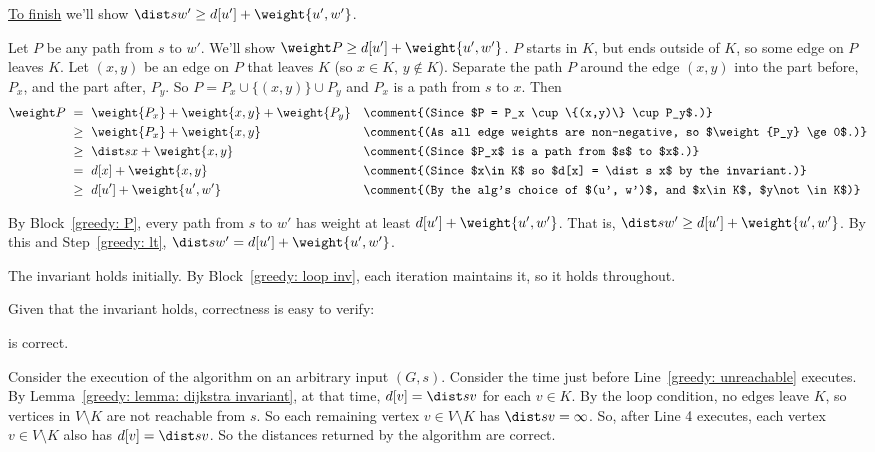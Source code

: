 \begin{longFormProof}
\begin{block}
    \smallskip
    \step \underline{To finish} we'll show $\dist s {w'} \ge d[u'] + \weight {u', w'}$.
    \begin{block}[greedy: P]
      \step Let $P$ be any path from $s$ to $w'$.  We'll show $\weight P \ge d[u'] + \weight {u', w'}$.
      \step $P$ starts in $K$, but ends outside of $K$, so some edge on $P$ leaves $K$.
      \step Let $(x,y)$ be an edge on $P$ that leaves $K$ (so $x\in K$, $y\not\in K$).
      \step Separate the path $P$ around the edge $(x,y)$ into
      the part before, $P_x$, and the part after, $P_y$.
      \step So $P = P_x \cup \{(x,y)\} \cup P_y$ and $P_x$ is a path from $s$ to $x$. Then
      \begin{align*}
        \weight P~
        &=~ \weight {P_x} + \weight {x,y} + \weight {P_y}
        && \comment{(Since $P = P_x \cup \{(x,y)\} \cup P_y$.)}
        \\
        &\ge~ \weight {P_x} + \weight {x,y}
        && \comment{(As all edge weights are non-negative, so $\weight {P_y} \ge 0$.)}
        \\
        &\ge~ \dist s x + \weight {x,y}
        && \comment{(Since $P_x$ is a path from $s$ to $x$.)}
        \\
        &=~ d[x] + \weight {x,y}
        && \comment{(Since $x\in K$ so $d[x] = \dist s x$ by the invariant.)}
        \\
        &\ge~ d[u'] + \weight {u',w'}
        && \comment{(By the alg's choice of $(u', w')$, and $x\in K$, $y\not\in K$)}
      \end{align*}
    \end{block}
    \step By Block~\ref{greedy: P}, every path from $s$ to $w'$
    has weight at least $d[u'] + \weight {u',w'}$.
    \step That is, $\dist s {w'} \ge d[u'] + \weight {u',w'}$.
    \smallskip
    \step By this and Step~\ref{greedy: lt}, $\dist s {w'} = d[u'] + \weight {u',w'}$.
  \end{block}
  \step The invariant holds initially. By Block~\ref{greedy: loop inv}, each iteration maintains it, so it holds throughout.
  \vspace*{-0.5ex}
\end{longFormProof}

Given that the invariant holds, correctness is easy to verify:

\begin{theorem}
  \Dijkstra is correct.
\end{theorem}
\begin{longFormProof}
  \step Consider the execution of the algorithm on an arbitrary input $(G, s)$.
  \step Consider the time just before Line~\ref{greedy: unreachable} executes.
  \step By Lemma~\ref{greedy: lemma: dijkstra invariant}, at that time, $d[v] = \dist s v$ for each $v\in K$.
  \step By the loop condition, no edges leave $K$, so vertices in $V\setminus K$ are not reachable from $s$.
\step So each remaining vertex $v\in V\setminus K$ has $\dist s v = \infty$.
\step So, after Line 4 executes, each vertex $v\in V\setminus K$ also has $d[v] = \dist s v$.
\step So the distances returned by the algorithm are correct.
\end{longFormProof}

